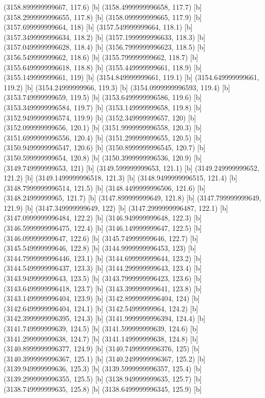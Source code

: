 {{{(3158.899999999667, 117.6) [b] 
(3158.4999999996658, 117.7) [b] 
(3158.2999999996655, 117.8) [b] 
(3158.099999999665, 117.9) [b] 
(3157.699999999664, 118) [b] 
(3157.549999999664, 118.1) [b] 
(3157.3499999996634, 118.2) [b] 
(3157.1999999996633, 118.3) [b] 
(3157.0499999996628, 118.4) [b] 
(3156.7999999996623, 118.5) [b] 
(3156.549999999662, 118.6) [b] 
(3155.799999999662, 118.7) [b] 
(3155.6499999996618, 118.8) [b] 
(3155.449999999661, 118.9) [b] 
(3155.149999999661, 119) [b] 
(3154.849999999661, 119.1) [b] 
(3154.649999999661, 119.2) [b] 
(3154.24999999966, 119.3) [b] 
(3154.0999999996593, 119.4) [b] 
(3153.749999999659, 119.5) [b] 
(3153.6499999996586, 119.6) [b] 
(3153.3499999996584, 119.7) [b] 
(3153.149999999658, 119.8) [b] 
(3152.9499999996574, 119.9) [b] 
(3152.349999999657, 120) [b] 
(3152.099999999656, 120.1) [b] 
(3151.9999999996558, 120.3) [b] 
(3151.6999999996556, 120.4) [b] 
(3151.299999999655, 120.5) [b] 
(3150.9499999996547, 120.6) [b] 
(3150.8999999996545, 120.7) [b] 
(3150.599999999654, 120.8) [b] 
(3150.3999999996536, 120.9) [b] 
(3149.749999999653, 121) [b] 
(3149.599999999653, 121.1) [b] 
(3149.249999999652, 121.2) [b] 
(3149.1499999996518, 121.3) [b] 
(3148.9499999996515, 121.4) [b] 
(3148.7999999996514, 121.5) [b] 
(3148.4499999996506, 121.6) [b] 
(3148.24999999965, 121.7) [b] 
(3147.899999999649, 121.8) [b] 
(3147.799999999649, 121.9) [b] 
(3147.349999999649, 122) [b] 
(3147.2999999996487, 122.1) [b] 
(3147.0999999996484, 122.2) [b] 
(3146.949999999648, 122.3) [b] 
(3146.5999999996475, 122.4) [b] 
(3146.149999999647, 122.5) [b] 
(3146.099999999647, 122.6) [b] 
(3145.749999999646, 122.7) [b] 
(3145.549999999646, 122.8) [b] 
(3144.9999999996453, 123) [b] 
(3144.7999999996446, 123.1) [b] 
(3144.699999999644, 123.2) [b] 
(3144.5499999996437, 123.3) [b] 
(3144.299999999643, 123.4) [b] 
(3143.949999999643, 123.5) [b] 
(3143.7999999996423, 123.6) [b] 
(3143.6499999996418, 123.7) [b] 
(3143.399999999641, 123.8) [b] 
(3143.1499999996404, 123.9) [b] 
(3142.8999999996404, 124) [b] 
(3142.6499999996404, 124.1) [b] 
(3142.54999999964, 124.2) [b] 
(3142.3999999996395, 124.3) [b] 
(3141.9999999996394, 124.4) [b] 
(3141.749999999639, 124.5) [b] 
(3141.599999999639, 124.6) [b] 
(3141.299999999638, 124.7) [b] 
(3141.149999999638, 124.8) [b] 
(3140.8999999996377, 124.9) [b] 
(3140.7499999996376, 125) [b] 
(3140.3999999996367, 125.1) [b] 
(3140.2499999996367, 125.2) [b] 
(3139.949999999636, 125.3) [b] 
(3139.5999999996357, 125.4) [b] 
(3139.2999999996355, 125.5) [b] 
(3138.949999999635, 125.7) [b] 
(3138.749999999635, 125.8) [b] 
(3138.6499999996345, 125.9) [b] 
}}}
